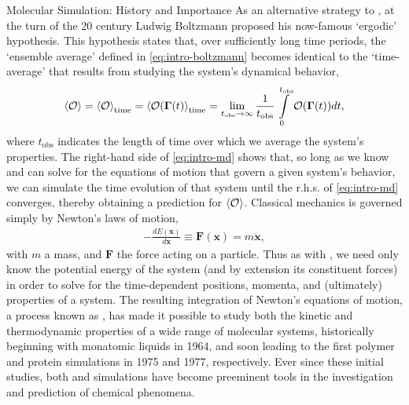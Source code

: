 \begin{section}{Molecular Simulation: History and Importance}
As an alternative strategy to \mc,
at the turn of the 20 century
Ludwig Boltzmann proposed his now-famous `ergodic'
hypothesis.\cite{boltzmann1898vorlesungen} This hypothesis states that, over sufficiently
long time periods, the `ensemble average' defined in \cref{eq:intro-boltzmann} becomes
identical to the `time-average' that results from studying the system's
dynamical behavior,
%
\newcommand{\tobs}{\ensuremath{t_{\text{obs}}}\xspace}
\begin{align}
\label{eq:intro-md}
\braket{\mathcal{O}} = \braket{\mathcal{O}}_{\text{time}} 
= \braket{\mathcal{O}(\bm{\Gamma}(t)}_{\text{time}} 
= \lim_{t_{\text{obs}} \to \infty} \frac{1}{t_{\text{obs}}}
\int\limits_0^{t_{\text{obs}}}
\mathcal{O}(\bm{\Gamma}(t)) dt ,
\end{align}
%
where \tobs indicates the length of time over which we average the system's
properties.\cite{allen1989computer} The
right-hand side of \cref{eq:intro-md} shows that, so long as we know and can
solve for the equations of motion that govern a given system's behavior, we can
simulate the time evolution of that system until the r.h.s. of
\cref{eq:intro-md} converges, thereby obtaining a prediction for
$\braket{\mathcal{O}}$.
Classical mechanics is
governed simply by Newton's laws of motion,
%
\begin{align}
\label{eq:intro-newton}
- \frac{d E(\bm x)}{d \bm x} \equiv \bm F(\bm x) = m \ddot{\bm x}, 
\end{align}
%
with $m$ a mass, and $\bm F$ the force acting on a
particle. Thus as with \mc, we need only know the potential energy of
the system (and by extension its constituent forces)
in order to solve for the
time-dependent positions, momenta, and (ultimately) properties of a system.
The resulting integration of Newton's equations of motion, a process known
as \md,
has made it possible to study both the kinetic and
thermodynamic properties of a wide range of molecular systems, historically beginning with monatomic
liquids in 1964, and soon leading to the first polymer and protein simulations in 1975 and
1977, respectively.\cite{VanGunsteren1990} Ever since these initial studies, both \mc and \md simulations have
become preeminent tools in the investigation and prediction of chemical
phenomena.





\end{section}
